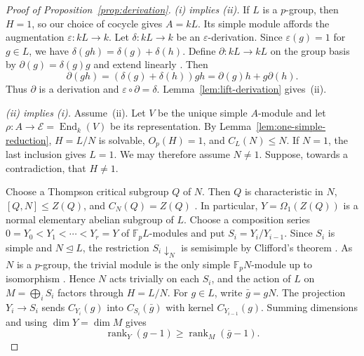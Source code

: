 \documentclass[11pt,a4paper]{article}
\theoremstyle{definition}
\theoremstyle{remark}
\numberwithin{equation}{section}
\newcommand{\Fp}{\mathbb{F}_p}
\DeclareMathOperator{\End}{End}
\DeclareMathOperator{\rank}{rank}
\begin{document}
	\begin{proof}[Proof of Proposition~\ref{prop:derivation}]
		\emph{(i) implies (ii).}
		If $L$ is a $p$-group, then $H=1$, so our choice of cocycle gives
		$A=kL$. Its simple module affords the augmentation $\varepsilon:kL\to k$.
		Let $\delta:kL\to k$ be an $\varepsilon$-derivation. Since
		$\varepsilon(g)=1$ for $g\in L$, we have $\delta(gh)=\delta(g)+\delta(h)$.
		Define $\partial:kL\to kL$ on the group basis by $\partial(g)=\delta(g)g$
		and extend linearly \cite[p.~341]{FarkasGreenMarcos2000}. Then
		\[
		\partial(gh)=(\delta(g)+\delta(h))gh
		=\partial(g)h+g\partial(h).
		\]
		Thus $\partial$ is a derivation and $\varepsilon\circ\partial=\delta$.
		Lemma~\ref{lem:lift-derivation} gives~(ii).
		
		\emph{(ii) implies (i).}
		Assume~(ii). Let $V$ be the unique simple $A$-module and let
		$\rho:A\to\mathcal E=\End_k(V)$ be its representation.
		By Lemma~\ref{lem:one-simple-reduction}, $H=L/N$ is solvable,
		$O_p(H)=1$, and $C_L(N)\le N$. If $N=1$, the last inclusion gives
		$L=1$. We may therefore assume $N\ne1$. Suppose, towards a
		contradiction, that $H\ne1$.
		
		Choose a Thompson critical subgroup $Q$ of $N$. Then $Q$ is
		characteristic in $N$, $[Q,N]\le Z(Q)$, and $C_N(Q)=Z(Q)$
		\cite[Theorem~6.5]{Craven2008}. In particular, $Y=\Omega_1(Z(Q))$ is a
		normal elementary abelian subgroup of $L$. Choose a composition series
		$0=Y_0<Y_1<\cdots<Y_r=Y$ of $\Fp L$-modules and put
		$S_i=Y_i/Y_{i-1}$. Since $S_i$ is simple and $N\unlhd L$, the restriction
		$S_i\!\downarrow_N$ is semisimple by Clifford's theorem
		\cite[Theorem~5.3.1]{Webb2016}. As $N$ is a $p$-group, the trivial
		module is the only simple $\Fp N$-module up to isomorphism
		\cite[Proposition~6.2.1]{Webb2016}. Hence $N$ acts trivially on each $S_i$,
		and the action of $L$ on $M=\bigoplus_i S_i$ factors through $H=L/N$.
		For $g\in L$, write $\bar g=gN$. The projection
		$Y_i\to S_i$ sends $C_{Y_i}(g)$ into $C_{S_i}(\bar g)$ with kernel
		$C_{Y_{i-1}}(g)$. Summing dimensions and using $\dim Y=\dim M$ gives
		\begin{equation}\label{eq:rank-composition}
			\rank_Y(g-1)\ge \rank_M(\bar g-1).
		\end{equation}
		

\end{proof}
\end{document}
